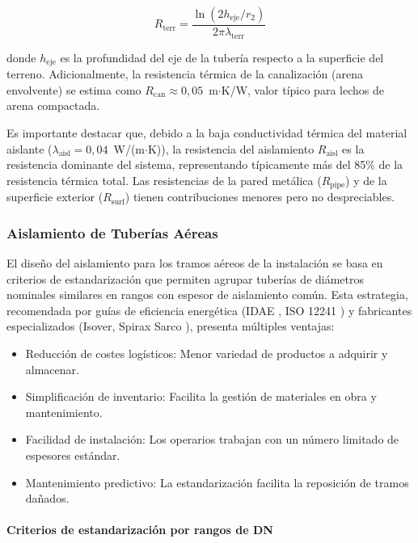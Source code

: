 \documentclass[12pt]{article}
\begin{document}
\begin{equation}
	R_{\text{terr}} = \frac{\ln(2 h_{\text{eje}} / r_2)}{2\pi \lambda_{\text{terr}}}
	\label{eq:resist_terreno}
\end{equation}

\noindent donde $h_{\text{eje}}$ es la profundidad del eje de la tubería respecto a la superficie del terreno. Adicionalmente, la resistencia térmica de la canalización (arena envolvente) se estima como $R_{\text{can}} \approx 0{,}05$~m$\cdot$K/W, valor típico para lechos de arena compactada.

Es importante destacar que, debido a la baja conductividad térmica del material aislante ($\lambda_{\text{aisl}} = 0{,}04$~W/(m$\cdot$K)), la resistencia del aislamiento $R_{\text{aisl}}$ es la resistencia dominante del sistema, representando típicamente más del 85\% de la resistencia térmica total. Las resistencias de la pared metálica ($R_{\text{pipe}}$) y de la superficie exterior ($R_{\text{surf}}$) tienen contribuciones menores pero no despreciables.


\subsubsection{Aislamiento de Tuberías Aéreas}
\label{subsubsec:aislamiento_aereo}

El diseño del aislamiento para los tramos aéreos de la instalación se basa en criterios de estandarización que permiten agrupar tuberías de diámetros nominales similares en rangos con espesor de aislamiento común. Esta estrategia, recomendada por guías de eficiencia energética (IDAE \cite{IDAE2007}, ISO 12241 \cite{ISO12241}) y fabricantes especializados (Isover, Spirax Sarco \cite{SpiraxSarco2020}), presenta múltiples ventajas:

\begin{itemize}[noitemsep]
	\item Reducción de costes logísticos: Menor variedad de productos a adquirir y almacenar.
	\item Simplificación de inventario: Facilita la gestión de materiales en obra y mantenimiento.
	\item Facilidad de instalación: Los operarios trabajan con un número limitado de espesores estándar.
	\item Mantenimiento predictivo: La estandarización facilita la reposición de tramos dañados.
\end{itemize}

\paragraph{Criterios de estandarización por rangos de DN}
\label{par:rangos_estandarizados}
\end{document}
